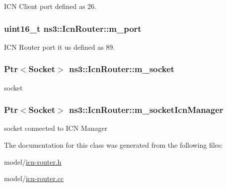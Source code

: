 I\-C\-N Client port defined as 26. 

\hypertarget{classns3_1_1IcnRouter_a793e6ef791d5581f4741e47cc969547e}{
\subsubsection[{m\-\_\-port}]{\setlength{\rightskip}{0pt plus 5cm}uint16\-\_\-t ns3\-::\-Icn\-Router\-::m\-\_\-port\hspace{0.3cm}{\ttfamily [private]}}}\label{classns3_1_1IcnRouter_a793e6ef791d5581f4741e47cc969547e}


I\-C\-N Router port it us defined as 89. 

\hypertarget{classns3_1_1IcnRouter_a2b69d463e55b4be9f372c51bdb673d50}{
\subsubsection[{m\-\_\-socket}]{\setlength{\rightskip}{0pt plus 5cm}Ptr$<$Socket$>$ ns3\-::\-Icn\-Router\-::m\-\_\-socket\hspace{0.3cm}{\ttfamily [private]}}}\label{classns3_1_1IcnRouter_a2b69d463e55b4be9f372c51bdb673d50}


socket 

\hypertarget{classns3_1_1IcnRouter_ada56beecc0b64ce0ad38552c445dae88}{
\subsubsection[{m\-\_\-socket\-Icn\-Manager}]{\setlength{\rightskip}{0pt plus 5cm}Ptr$<$Socket$>$ ns3\-::\-Icn\-Router\-::m\-\_\-socket\-Icn\-Manager\hspace{0.3cm}{\ttfamily [private]}}}\label{classns3_1_1IcnRouter_ada56beecc0b64ce0ad38552c445dae88}


socket connected to I\-C\-N Manager 



The documentation for this class was generated from the following files\-:\begin{DoxyCompactItemize}
\item 
model/\hyperlink{icn-router_8h}{icn-\/router.\-h}\item 
model/\hyperlink{icn-router_8cc}{icn-\/router.\-cc}\end{DoxyCompactItemize}
